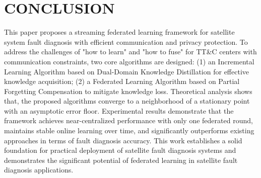 \section{CONCLUSION}\label{sec:conclusion}
This paper proposes a streaming federated learning framework for satellite system fault diagnosis with efficient communication and privacy protection. 
To address the challenges of "how to learn" and "how to fuse" for TT\&C centers with communication constraints, 
two core algorithms are designed:
(1) an Incremental Learning Algorithm based on Dual-Domain Knowledge Distillation for effective knowledge acquisition;
(2) a Federated Learning Algorithm based on Partial Forgetting Compensation to mitigate knowledge loss.
Theoretical analysis shows that, the proposed algorithms converge to a neighborhood of a stationary point with an asymptotic error floor.
Experimental results demonstrate that the framework achieves near-centralized performance with only one federated round, 
maintains stable online learning over time, and significantly outperforms existing approaches in terms of fault diagnosis accuracy. 
This work establishes a solid foundation for practical deployment of satellite fault diagnosis systems 
and demonstrates the significant potential of federated learning in satellite fault diagnosis applications.